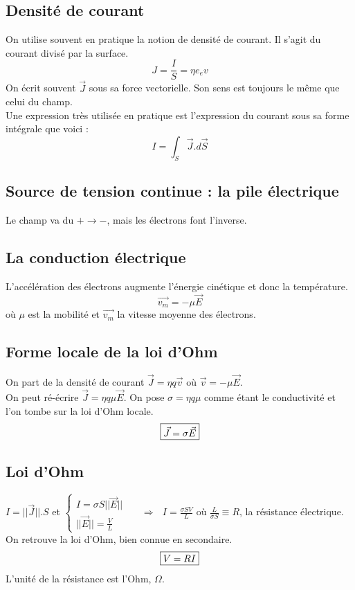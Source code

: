 \documentclass	[11pt, a4paper, openany]{book}
\begin{document}
\subsection{Densité de courant}
On utilise souvent en pratique la notion de densité de courant. Il s'agit du courant divisé par la surface.
\begin{equation}
	J = \frac{I}{S}= \eta e_e v
\end{equation}
On écrit souvent $\vec{J}$ sous sa force vectorielle. Son sens est toujours le même que celui du champ. \\
Une expression très utilisée en pratique est l'expression du courant sous sa forme intégrale que voici :
\begin{equation}
	I = \int_S \vec{J}.d\vec{S}
\end{equation}

\subsection{Source de tension continue : la pile électrique}
Le champ va du $+ \rightarrow -$, mais les électrons font l'inverse.

\subsection{La conduction électrique}
L'accélération des électrons augmente l'énergie cinétique et donc la température. 
\begin{equation}
	\vec{v_m} = -\mu \vec{E}
\end{equation}
où $\mu$ est la mobilité et $\vec{v_m}$ la vitesse moyenne des électrons.

\subsection{Forme locale de la loi d'Ohm}
On part de la densité de courant $\vec{J} = \eta q \vec{v}$ où $\vec{v} = -\mu \vec{E}$.\\
On peut ré-écrire $\vec{J} = \eta q \mu \vec{E}$. On pose $\sigma = \eta q \mu$ comme étant le conductivité et l'on tombe sur la loi d'Ohm locale.
\begin{equation}
	\fbox{$\vec{J} = \sigma\vec{E}$}
\end{equation}

\subsection{Loi d'Ohm}
$I = ||\vec{J}||.S$ et $\left\{\begin{array}{l}
I = \sigma S ||\vec{E}||\\
||\vec{E}|| = \frac{V}{L}
\end{array}\right.$\ \ \ $\Rightarrow\ \ \ I = \frac{\sigma S V}{L}$ où $\frac{L}{\sigma S} \equiv R$, la résistance électrique.\\
On retrouve la loi d'Ohm, bien connue en secondaire.
\begin{equation}
	\fbox{$V = RI$}
\end{equation}
L'unité de la résistance est l'Ohm, $\Omega$.
\end{document}
